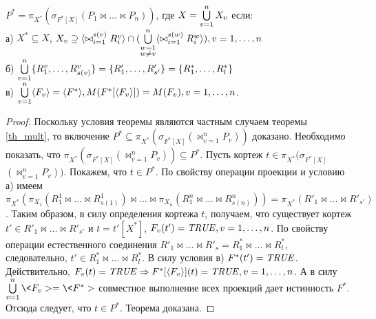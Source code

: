 \author{Мосин Сергей, Зыкин Сергей}
\begin{theorem}
$P^{\ast} = \pi_{X^{\ast}} ( \sigma_{F^{\ast}[X]} (P_1 \bowtie \dots \bowtie 
P_n))$, где $X = \bigcup\limits_{v=1}^{n} X_{v}$ если:
\\а) $X^{\ast} \subseteq X$, $X_v \supseteq \<\bowtie_{i=1}^{s(v)} R^v_i> \cap (\bigcup\limits_{\substack{w=1\\ w \neq v}}^{n} \<\bowtie_{i=1}^{s(w)} R^w_i> ), v = 1,\dots,n$
\\б)
$ \bigcup\limits_{v=1}^{n} \{R^{v}_{1}, \ldots, R^{v}_{s(v)}\} = \{R'_{1}, \ldots, R'_{s'}\}
= \{R^{\ast}_{1}, \ldots, R^{\ast}_{l}\} $
\\в) $\bigcupn \<F_v> = \<F^{\ast}> , M (F^{\ast}[\<F_v> ]) = M (F_{v}), v = 1,\dots,n$.
\label{th_mult_eq}
\end{theorem} 
\begin{proof}

Поскольку условия теоремы являются частным случаем теоремы \ref{th_mult}, то
включение $P^{\ast} \subseteq \pi_{X^{\ast}} ( \sigma_{F^{\ast}[X]} (\bowtie_{v=1}^{n} P_{v}))$
доказано. Необходимо показать, что
$\pi_{X^{\ast}} ( \sigma_{F^{\ast}[X]} (\bowtie_{v=1}^{n} P_{v})) \subseteq P^{\ast}$. Пусть
кортеж $t \in \pi_{X^{\ast}} ( \sigma_{F^{\ast}[X]}$ $(\bowtie_{v=1}^{n} P_{v}))$. Покажем, что
$t \in P^{\ast}$. По свойству операции проекции и условию а) имеем
$\pi_{X^{\ast}}(\pi_{X_1}(R^1_1 \bowtie \dots \bowtie R^1_{s(1)}) \bowtie \dots
\bowtie \pi_{X_n}(R^n_1 \bowtie \dots \bowtie R^n_{s(n)})) = \pi_{X^{\ast}}
(R'_1 \bowtie \dots \bowtie R'_{s'})$. Таким образом, в силу определения кортежа
$t$, получаем, что существует кортеж  $t' \in R'_1 \bowtie \ldots \bowtie
R'_{s'}$ и $t = t'[X^{\ast}]$, $F_v(t')=\mathit{TRUE}, v = 1,\dots,n$. По свойству
операции естественного соединения $R'_1 \bowtie \ldots \bowtie R'_s = R^{\ast}_1
\bowtie \ldots \bowtie R^{\ast}_l$, следовательно, $t' \in R^{\ast}_1 \bowtie
\ldots \bowtie R^{\ast}_l$. В силу условия в) $F^{\ast} (t')=\mathit{TRUE}$.
Действительно, $F_v(t) = \n{TRUE} \Rightarrow F^{\ast}[\<F_v> ](t) = \n{TRUE}, v
= 1,\dots,n $. А в силу $\bigcupn \<F_v> = \<F^{\ast}> $ совместное выполнение
всех проекций дает истинность $F^{\ast}$. Отсюда следует, что $t \in P^{\ast}$.
Теорема доказана.
\end{proof} 
